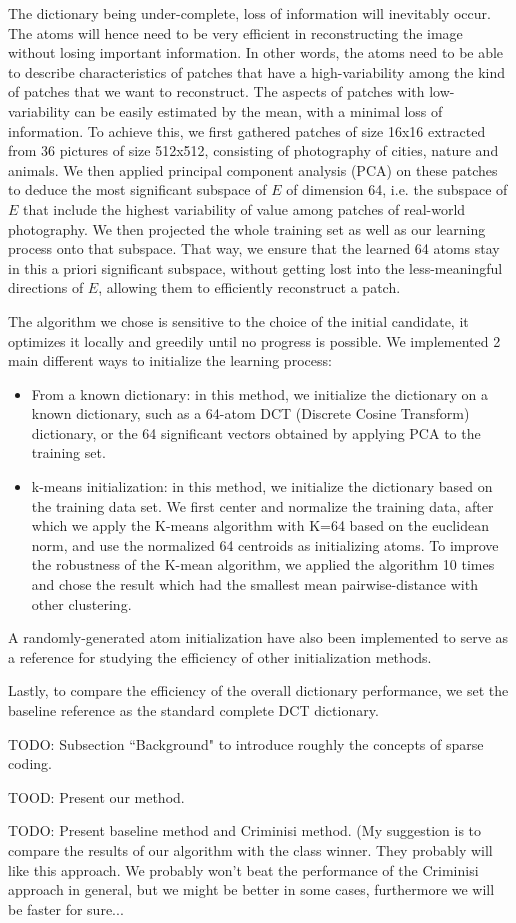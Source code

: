 The dictionary being under-complete, loss of information will inevitably occur. The atoms will hence need to be very efficient in reconstructing the image without losing important information. In other words, the atoms need to be able to describe characteristics of patches that have a high-variability among the kind of patches that we want to reconstruct. The aspects of patches with low-variability can be easily estimated by the mean, with a minimal loss of information. 
To achieve this, we first gathered patches of size 16x16 extracted from 36 pictures of size 512x512, consisting of photography of cities, nature and animals. We then applied principal component analysis (PCA) on these patches to deduce the most significant subspace of $E$ of dimension 64, i.e. the subspace of $E$ that include the highest variability of value among patches of real-world photography. We then projected the whole training set as well as our learning process onto that subspace. That way, we ensure that the learned 64 atoms stay in this a priori significant subspace, without getting lost into the less-meaningful directions of $E$, allowing them to efficiently reconstruct a patch.

The algorithm we chose is sensitive to the choice of the initial candidate, it optimizes it locally and greedily until no progress is possible. We implemented 2 main different ways to initialize the learning process:
\begin{itemize}
   \item From a known dictionary: in this method, we initialize the dictionary on a known dictionary, such as a 64-atom DCT (Discrete Cosine Transform) dictionary, or the 64 significant vectors obtained by applying PCA to the training set.  
   \item k-means initialization: in this method, we initialize the dictionary based on the training data set. We first center and normalize the training data, after which we apply the K-means algorithm with K=64 based on the euclidean norm, and use the normalized 64 centroids as initializing atoms. To improve the robustness of the K-mean algorithm, we applied the algorithm 10 times and chose the result which had the smallest mean pairwise-distance with other clustering. 
\end{itemize}
A randomly-generated atom initialization have also been implemented to serve as a reference for studying the efficiency of other initialization methods. 

Lastly, to compare the efficiency of the overall dictionary performance, we set the baseline reference as the standard complete DCT dictionary.




TODO: Subsection ``Background" to introduce roughly the concepts of sparse coding.

TOOD: Present our method.

TODO: Present baseline method and Criminisi method. (My suggestion is to compare the results of our algorithm with the class winner. They probably will like this approach. We probably won't beat the performance of the Criminisi approach in general, but we might be better in some cases, furthermore we will be faster for sure...
